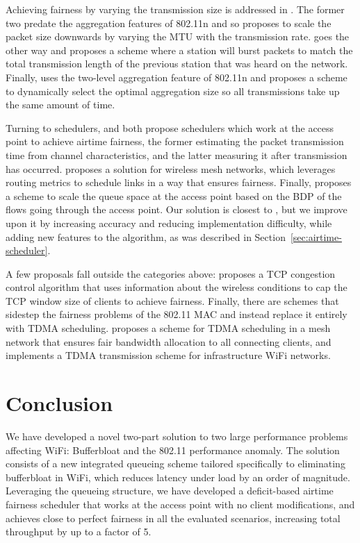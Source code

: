 \documentclass[english]{scrartcl}
\begin{document}
Achieving fairness by varying the transmission size is addressed in
\cite{dunn_practical_2004,razafindralambo_dynamic_2006,kim_adaptive_2015}. The
former two predate the aggregation features of 802.11n and so
\cite{dunn_practical_2004} proposes to scale the packet size downwards by
varying the MTU with the transmission rate. \cite{razafindralambo_dynamic_2006}
goes the other way and proposes a scheme where a station will burst packets to
match the total transmission length of the previous station that was heard on
the network. Finally, \cite{kim_adaptive_2015} uses the two-level aggregation
feature of 802.11n and proposes a scheme to dynamically select the optimal
aggregation size so all transmissions take up the same amount of time.

Turning to schedulers, \cite{gomez_efficient_2011} and
\cite{garroppo_providing_2007} both propose schedulers which work at the access
point to achieve airtime fairness, the former estimating the packet transmission
time from channel characteristics, and the latter measuring it after
transmission has occurred. \cite{riggio_airtime_2008} proposes a solution for
wireless mesh networks, which leverages routing metrics to schedule links in a
way that ensures fairness. Finally, \cite{kliazovich_queue_2011} proposes a
scheme to scale the queue space at the access point based on the BDP of the
flows going through the access point. Our solution is closest to
\cite{garroppo_providing_2007}, but we improve upon it by increasing accuracy
and reducing implementation difficulty, while adding new features to the
algorithm, as was described in Section \ref{sec:airtime-scheduler}.

A few proposals fall outside the categories above:
\cite{kashibuchi_channel_2010} proposes a TCP congestion control algorithm that
uses information about the wireless conditions to cap the TCP window size of
clients to achieve fairness. Finally, there are schemes that sidestep the
fairness problems of the 802.11 MAC and instead replace it entirely with TDMA
scheduling. \cite{ben_salem_fair_2005} proposes a scheme for TDMA scheduling in
a mesh network that ensures fair bandwidth allocation to all connecting clients,
and \cite{torfs_tdma_2015} implements a TDMA transmission scheme for
infrastructure WiFi networks.

\section{Conclusion}
\label{sec:conclusion}
We have developed a novel two-part solution to two large performance problems
affecting WiFi: Bufferbloat and the 802.11 performance anomaly. The solution
consists of a new integrated queueing scheme tailored specifically to
eliminating bufferbloat in WiFi, which reduces latency under load by an order of
magnitude. Leveraging the queueing structure, we have developed a deficit-based
airtime fairness scheduler that works at the access point with no client
modifications, and achieves close to perfect fairness in all the evaluated
scenarios, increasing total throughput by up to a factor of 5.
\end{document}
